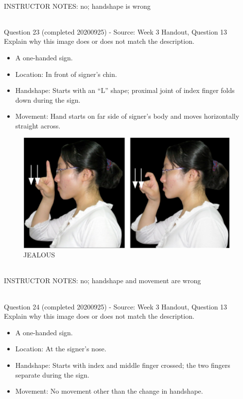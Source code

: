 \documentclass[12pt]{article}
\begin{document}
~\\
INSTRUCTOR NOTES: no; handshape is wrong


~\\

{\large Question 23} (completed 20200925) - Source: Week 3 Handout, Question 13\\

Explain why this image does or does not match the description.\\

\begin{itemize} \item A one-handed sign. \item Location: In front of signer’s chin. \item Handshape: Starts with an “L” shape; proximal joint of index finger folds down during the sign. \item Movement: Hand starts on far side of signer’s body and moves horizontally straight across. \end{itemize}

\begin{figure}[H]
\includegraphics{../images/taiwansign_jealous.png}
\caption{JEALOUS}
\end{figure}

~\\
INSTRUCTOR NOTES: no; handshape and movement are wrong


~\\

{\large Question 24} (completed 20200925) - Source: Week 3 Handout, Question 13\\

Explain why this image does or does not match the description.\\

\begin{itemize} \item A one-handed sign. \item Location: At the signer’s nose. \item Handshape: Starts with index and middle finger crossed; the two fingers separate during the sign. \item Movement: No movement other than the change in handshape. \end{itemize}
\end{document}
